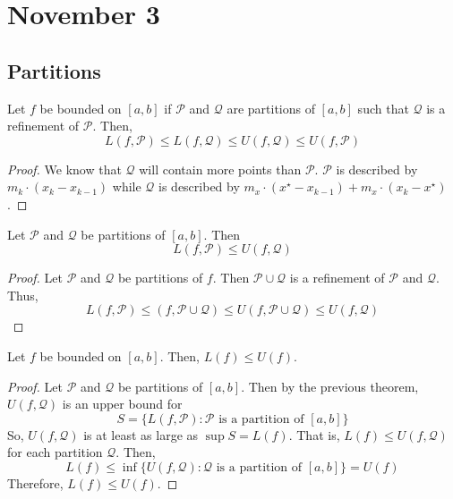 \section{November 3}

\subsection{Partitions}
\begin{theorem}
    Let $f$ be bounded on $[a, b]$ if $\mathcal{P}$ and $\mathcal{Q}$ are partitions of $[a, b]$ such that $\mathcal{Q}$ is a refinement of $\mathcal{P}$. Then, $$L(f, \mathcal{P}) \leq L(f, \mathcal{Q}) \leq U(f, \mathcal{Q}) \leq U(f, \mathcal{P})$$
\end{theorem}
\begin{proof}
    We know that $\mathcal{Q}$ will contain more points than $\mathcal{P}$. $\mathcal{P}$ is described by $m_k \cdot (x_k - x_{k - 1})$ while $\mathcal{Q}$ is described by $m_x \cdot (x^\star - x_{k - 1}) + m_x \cdot (x_k - x^\star)$.
\end{proof}

\begin{theorem}
    Let $\mathcal{P}$ and $\mathcal{Q}$ be partitions of $[a, b]$. Then $$L(f, \mathcal{P}) \leq U(f, \mathcal{Q})$$
\end{theorem}
\begin{proof}
    Let $\mathcal{P}$ and $\mathcal{Q}$ be partitions of $f$. Then $\mathcal{P} \cup \mathcal{Q}$ is a refinement of $\mathcal{P}$ and $\mathcal{Q}$. Thus, $$L(f, \mathcal{P}) \leq (f, \mathcal{P} \cup \mathcal{Q}) \leq U(f, \mathcal{P} \cup \mathcal{Q}) \leq U(f, \mathcal{Q})$$
\end{proof}

\begin{theorem}
    Let $f$ be bounded on $[a, b]$. Then, $L(f) \leq U(f)$.
\end{theorem}
\begin{proof}
    Let $\mathcal{P}$ and $\mathcal{Q}$ be partitions of $[a, b]$. Then by the previous theorem, $U(f, \mathcal{Q})$ is an upper bound for $$S = \{L(f, \mathcal{P}) : \text{$\mathcal{P}$ is a partition of $[a, b]$}\}$$
    So, $U(f, \mathcal{Q})$ is at least as large as $\sup S = L(f)$. That is, $L(f) \leq U(f, \mathcal{Q})$ for each partition $\mathcal{Q}$. Then, $$L(f) \leq \inf\{U(f, \mathcal{Q}) : \text{$\mathcal{Q}$ is a partition of $[a, b]$}\} = U(f)$$
    Therefore, $L(f) \leq U(f)$.
\end{proof}

